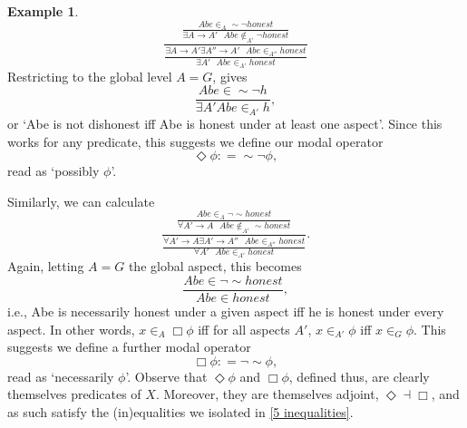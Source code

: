 \documentclass[a4paper]{book}
\theoremstyle{definition}
\newtheorem{example}{Example}[section]
\theoremstyle{definition}
\theoremstyle{definition}
\theoremstyle{theorem}
\theoremstyle{definition}
\begin{document}
\begin{example}
	\begin{equation*}
	\frac{\frac{Abe \in_A \sim \neg honest}{\exists A \rightarrow A' \text{ } Abe \notin_{A'} \neg honest}}{\frac{\exists A \rightarrow A' \exists A'' \rightarrow A' \text{ } Abe \in_{A''} honest}{\exists A' \text{ } Abe \in_{A'} honest}}
	\end{equation*}
	Restricting to the global level $A = G$, gives 
	\begin{equation*}
	\frac{Abe \in \sim \neg h}{\exists A' Abe \in_{A'} h},
	\end{equation*}
	or `Abe is not dishonest iff Abe is honest under at least one aspect'. Since this works for any predicate, this suggests we define our modal operator
	\begin{equation*}
	\Diamond \phi : = \sim \neg \phi,
	\end{equation*}
	read as `possibly $\phi$'. \par \noindent 
	Similarly, we can calculate 
	\begin{equation*}
	\frac{\frac{Abe \in_A \neg \sim honest}{\forall A' \rightarrow A \text{ } Abe \notin_{A'} \sim honest}}{\frac{\forall A' \rightarrow A \exists A' \rightarrow A'' \text{ } Abe \in_{A''} honest}{\forall A' \text{ } Abe \in_{A'} honest}}.
	\end{equation*}
	Again, letting $A = G$ the global aspect, this becomes 
	\begin{equation*}
	\frac{Abe \in \neg \sim honest}{Abe \in honest},
	\end{equation*}
	i.e., Abe is necessarily honest under a given aspect iff he is honest under every aspect. In other words, $x \in_A \Box \phi$ iff for all aspects $A'$, $x \in_{A'} \phi$ iff $x \in_G \phi$.  
	This suggests we define a further modal operator
	\begin{equation*}
	\Box \phi : = \neg \sim \phi,
	\end{equation*}
	read as `necessarily $\phi$'. Observe that $\Diamond \phi$ and $\Box \phi$, defined thus, are clearly themselves predicates of $X$. Moreover, they are themselves adjoint, $\Diamond \dashv \Box$, and as such satisfy the (in)equalities we isolated in \ref{5 inequalities}.

\end{example}
\end{document}
